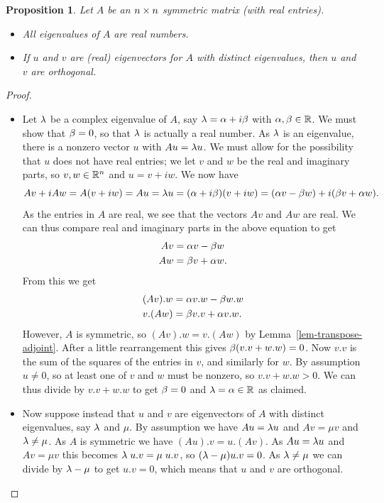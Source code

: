 \documentclass[reqno]{amsart}
\newtheorem{proposition}[theorem]{Proposition}
\theoremstyle{definition}
\begin{document}
\begin{proposition}\label{prop-symmetric-eigen}
 Let $A$ be an $n\times n$ symmetric matrix (with real entries).
 \begin{itemize}
  \item[(a)] All eigenvalues of $A$ are real numbers.
  \item[(b)] If $u$ and $v$ are (real) eigenvectors for $A$ with
   distinct eigenvalues, then $u$ and $v$ are orthogonal.
 \end{itemize}
\end{proposition}
\begin{proof}
 \begin{itemize}
  \item[(a)] Let $\lambda$ be a complex eigenvalue of $A$, say
   $\lambda=\alpha+i\beta$ with $\alpha,\beta\in{\mathbb{R}}$.  We must show that $\beta=0$, so
   that $\lambda$ is actually a real number.  As $\lambda$ is an eigenvalue,
   there is a nonzero vector $u$ with $Au=\lambda u$.  We must allow for
   the possibility that $u$ does not have real entries; we let $v$ and
   $w$ be the real and imaginary parts, so $v,w\in{\mathbb{R}}^n$ and $u=v+iw$.
   We now have
   \[ Av + iAw = A(v+iw) = Au = \lambda u =
       (\alpha+i\beta)(v+iw) = (\alpha v-\beta w)+i(\beta v+\alpha w).
   \]
   As the entries in $A$ are real, we see that the vectors $Av$ and
   $Aw$ are real.  We can thus compare real and imaginary parts in the
   above equation to get
   \begin{align*}
    Av &= \alpha v - \beta w \\
    Aw &= \beta v + \alpha w.
   \end{align*}
   From this we get
   \begin{align*}
    (Av).w &= \alpha v.w - \beta w.w \\
    v.(Aw) &= \beta v.v + \alpha v.w.
   \end{align*}
   However, $A$ is symmetric, so $(Av).w=v.(Aw)$ by
   Lemma~\ref{lem-transpose-adjoint}.  After a little rearrangement
   this gives $\beta(v.v+w.w)=0$.  Now $v.v$ is the sum of the squares
   of the entries in $v$, and similarly for $w$.  By assumption
   $u\neq 0$, so at least one of $v$ and $w$ must be nonzero, so
   $v.v+w.w>0$.  We can thus divide by $v.v+w.w$ to get $\beta=0$ and
   $\lambda=\alpha\in{\mathbb{R}}$ as claimed.
  \item[(b)] Now suppose instead that $u$ and $v$ are eigenvectors of
   $A$ with distinct eigenvalues, say $\lambda$ and $\mu$.  By assumption
   we have $Au=\lambda u$ and $Av=\mu v$ and $\lambda\neq\mu$.  As $A$ is
   symmetric we have $(Au).v=u.(Av)$.  As $Au=\lambda u$ and $Av=\mu v$
   this becomes $\lambda\;u.v=\mu\;u.v$, so $(\lambda-\mu)u.v=0$.  As
   $\lambda\neq\mu$ we can divide by $\lambda-\mu$ to get $u.v=0$, which means
   that $u$ and $v$ are orthogonal.
 \end{itemize}
\end{proof}
\end{document}
